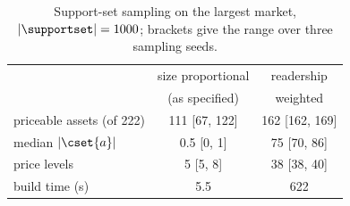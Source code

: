 \begin{table}[t]
  \centering
  \small
  \caption{Support-set sampling on the largest \sqlshare{} market, $|\supportset| = 1000$; brackets give the range over three sampling seeds.}
  \label{tab:sampling}
  \begin{tabular}{@{}lcc@{}}
    \toprule
    & size proportional & readership \\
    & (as specified) & weighted \\
    \midrule
    priceable assets (of 222) & 111 [67, 122] & 162 [162, 169] \\
    median $|\cset{a}|$ & 0.5 [0, 1] & 75 [70, 86] \\
    price levels & 5 [5, 8] & 38 [38, 40] \\
    build time (s) & 5.5 & 622 \\
    \bottomrule
  \end{tabular}
\end{table}
